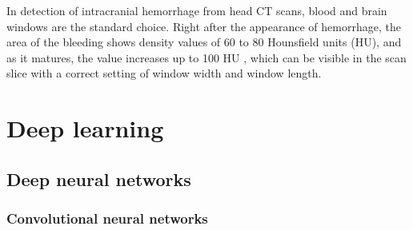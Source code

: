 In detection of intracranial hemorrhage from head CT scans, blood and brain windows are the standard choice. Right after the appearance of hemorrhage, the area of the bleeding shows density values of 60 to 80 Hounsfield units (HU), and as it matures, the value increases up to 100 HU  \cite{principlesOfCT}, which can be visible in the scan slice with a correct setting of window width and window length.

\chapter{Deep learning}
\section{Deep neural networks}
\subsection{Convolutional neural networks}



